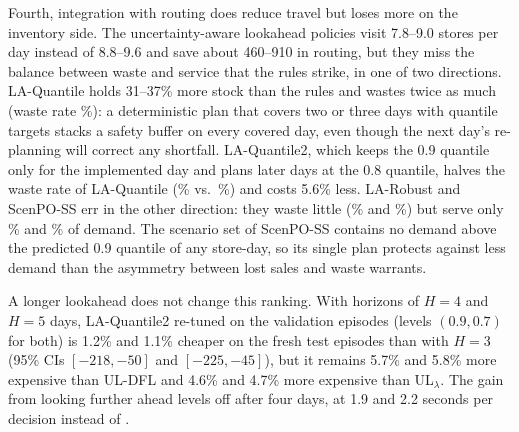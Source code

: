 Fourth, integration with routing does reduce travel but loses more on the inventory side. The uncertainty-aware lookahead policies visit 7.8--9.0 stores per day instead of 8.8--9.6 and save about 460--910 in routing, but they miss the balance between waste and service that the rules strike, in one of two directions. LA-Quantile holds 31--37\% more stock than the rules and wastes twice as much (waste rate \wasteLAQBaseFresh\%): a deterministic plan that covers two or three days with quantile targets stacks a safety buffer on every covered day, even though the next day's re-planning will correct any shortfall. LA-Quantile2, which keeps the 0.9 quantile only for the implemented day and plans later days at the 0.8 quantile, halves the waste rate of LA-Quantile (\wasteLAQTwoBaseFresh\% vs.\ \wasteLAQBaseFresh\%) and costs 5.6\% less. LA-Robust and ScenPO-SS err in the other direction: they waste little (\wasteLARobBaseFresh\% and \wasteScenPOBaseFresh\%) but serve only \fillLARobBaseFresh\% and \fillScenPOBaseFresh\% of demand. The scenario set of ScenPO-SS contains no demand above the predicted 0.9 quantile of any store-day, so its single plan protects against less demand than the asymmetry between lost sales and waste warrants.

A longer lookahead does not change this ranking. With horizons of $H=4$ and $H=5$ days, LA-Quantile2 re-tuned on the validation episodes (levels $(0.9,0.7)$ for both) is 1.2\% and 1.1\% cheaper on the fresh test episodes than with $H=3$ (95\% CIs $[-218,-50]$ and $[-225,-45]$), but it remains 5.7\% and 5.8\% more expensive than UL-DFL and 4.6\% and 4.7\% more expensive than UL$_\lambda$. The gain from looking further ahead levels off after four days, at 1.9 and 2.2 seconds per decision instead of \secsLAQTwoBaseFresh{}.

\begin{table}[H]
\centering\footnotesize
\caption{Paired episode-level comparisons of UL-DFL with every other policy (base case, fresh test episodes, 100 episodes). Negative differences favour UL-DFL. Rel.: mean of the episode-level relative differences, in percent of the comparator's cost. Holm adjustment over the five prespecified primary comparisons of UL-DFL.}\label{tab:testsul}
\setlength{\tabcolsep}{4pt}
\resizebox{\textwidth}{!}{}
\end{table}

